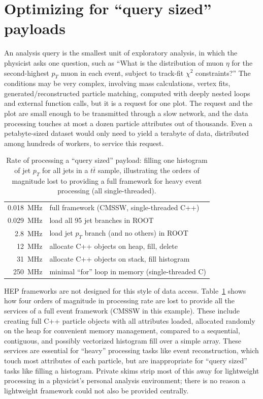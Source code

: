 \documentclass[a4paper]{jpconf}
\begin{document}
\section{Optimizing for ``query sized'' payloads}

An analysis query is the smallest unit of exploratory analysis, in which the physicist asks one question, such as ``What is the distribution of muon $\eta$ for the second-highest $p_T$ muon in each event, subject to track-fit $\chi^2$ constraints?'' The conditions may be very complex, involving mass calculations, vertex fits, generated/reconstructed particle matching, computed with deeply nested loops and external function calls, but it is a request for one plot. The request and the plot are small enough to be transmitted through a slow network, and the data processing touches at most a dozen particle attributes out of thousands. Even a petabyte-sized dataset would only need to yield a terabyte of data, distributed among hundreds of workers, to service this request.

\begin{table}
\caption{\label{tab:10k} Rate of processing a ``query sized'' payload: filling one histogram of jet $p_T$ for all jets in a $t\bar{t}$ sample, illustrating the orders of magnitude lost to providing a full framework for heavy event processing (all single-threaded).}

\vspace{0.25 cm}
\begin{center}
\begin{tabular}{r l}
0.018~MHz & full framework (CMSSW, single-threaded C++) \\
0.029~MHz & load all 95 jet branches in ROOT \\
2.8~MHz & load jet $p_T$ branch (and no others) in ROOT \\
12~MHz & allocate C++ objects on heap, fill, delete \\
31~MHz & allocate C++ objects on stack, fill histogram \\
250~MHz & minimal ``for'' loop in memory (single-threaded C)
\end{tabular}
\end{center}
\vspace{-0.75 cm}
\end{table}

HEP frameworks are not designed for this style of data access. Table~\ref{tab:10k} shows how four orders of magnitude in processing rate are lost to provide all the services of a full event framework (CMSSW in this example). These include creating full C++ particle objects with all attributes loaded, allocated randomly on the heap for convenient memory management, compared to a sequential, contiguous, and possibly vectorized histogram fill over a simple array. These services are essential for ``heavy'' processing tasks like event reconstruction, which touch most attributes of each particle, but are inappropriate for ``query sized'' tasks like filling a histogram. Private skims strip most of this away for lightweight processing in a physicist's personal analysis environment; there is no reason a lightweight framework could not also be provided centrally.
\end{document}
